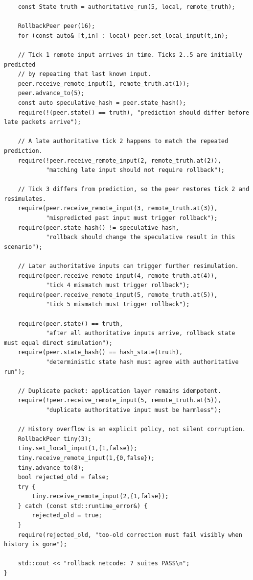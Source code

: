 \begin{verbatim}
    const State truth = authoritative_run(5, local, remote_truth);

    RollbackPeer peer(16);
    for (const auto& [t,in] : local) peer.set_local_input(t,in);

    // Tick 1 remote input arrives in time. Ticks 2..5 are initially predicted
    // by repeating that last known input.
    peer.receive_remote_input(1, remote_truth.at(1));
    peer.advance_to(5);
    const auto speculative_hash = peer.state_hash();
    require(!(peer.state() == truth), "prediction should differ before late packets arrive");

    // A late authoritative tick 2 happens to match the repeated prediction.
    require(!peer.receive_remote_input(2, remote_truth.at(2)),
            "matching late input should not require rollback");

    // Tick 3 differs from prediction, so the peer restores tick 2 and resimulates.
    require(peer.receive_remote_input(3, remote_truth.at(3)),
            "mispredicted past input must trigger rollback");
    require(peer.state_hash() != speculative_hash,
            "rollback should change the speculative result in this scenario");

    // Later authoritative inputs can trigger further resimulation.
    require(peer.receive_remote_input(4, remote_truth.at(4)),
            "tick 4 mismatch must trigger rollback");
    require(peer.receive_remote_input(5, remote_truth.at(5)),
            "tick 5 mismatch must trigger rollback");

    require(peer.state() == truth,
            "after all authoritative inputs arrive, rollback state must equal direct simulation");
    require(peer.state_hash() == hash_state(truth),
            "deterministic state hash must agree with authoritative run");

    // Duplicate packet: application layer remains idempotent.
    require(!peer.receive_remote_input(5, remote_truth.at(5)),
            "duplicate authoritative input must be harmless");

    // History overflow is an explicit policy, not silent corruption.
    RollbackPeer tiny(3);
    tiny.set_local_input(1,{1,false});
    tiny.receive_remote_input(1,{0,false});
    tiny.advance_to(8);
    bool rejected_old = false;
    try {
        tiny.receive_remote_input(2,{1,false});
    } catch (const std::runtime_error&) {
        rejected_old = true;
    }
    require(rejected_old, "too-old correction must fail visibly when history is gone");

    std::cout << "rollback netcode: 7 suites PASS\n";
}
\end{verbatim}

